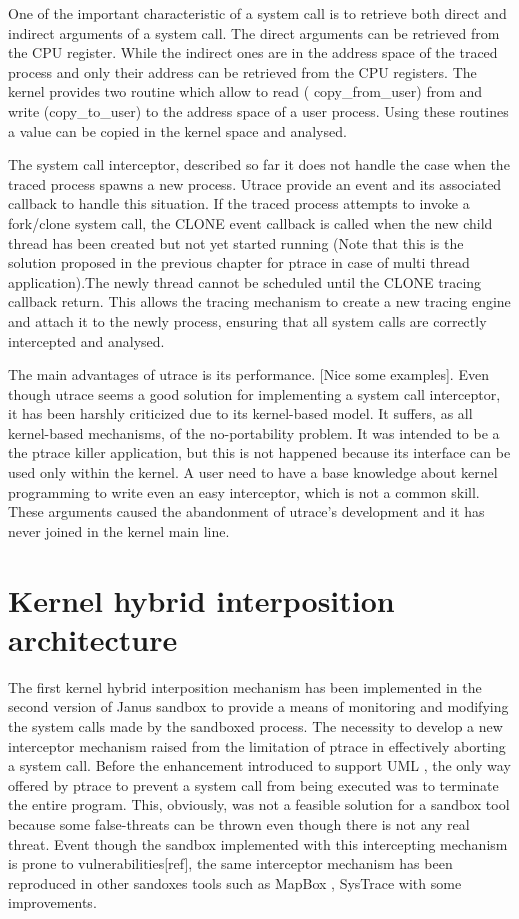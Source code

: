 One of the important characteristic of a system call is to retrieve both direct and indirect arguments of a system call. The direct arguments can be retrieved from the CPU register. While the indirect ones are in the address space of the traced process and only their address can be retrieved from the CPU registers. The kernel provides two routine which allow to read ( copy\_from\_user) from and write (copy\_to\_user) to the address space of a user process. Using these routines a value can be copied in the kernel space and analysed. 

The system call interceptor, described so far it does not handle the case when the traced process spawns a new process. Utrace provide an event and its associated callback to handle this situation. If the traced process attempts to invoke a fork/clone system call, the CLONE event callback is called when the new child thread has been created but not yet started running (Note that this is the solution proposed in the previous chapter for ptrace in case of multi thread application).The newly thread cannot be scheduled until the CLONE tracing callback return. 
This allows the tracing mechanism to create a new tracing engine and attach it to the newly process, ensuring that all system calls are correctly intercepted and analysed. 
 
The main advantages of utrace is its performance. [Nice some examples]. Even though utrace seems a good solution for implementing a system call interceptor, it has been harshly criticized due to its kernel-based model. It suffers, as all kernel-based mechanisms, of the no-portability problem. It was intended to be a the ptrace killer application, but this is not happened because its interface can be used only within the kernel. A user need to have a base knowledge about kernel programming to write even an easy interceptor, which is not a common skill. These arguments caused the abandonment of utrace's development and it has never joined in the kernel main line. 

\section{Kernel hybrid interposition architecture}
\label{interceptor_mechanism}

The first kernel hybrid interposition mechanism has been implemented in  the second version of Janus sandbox \cite{Janus} to provide a means of monitoring and modifying the system calls made by the sandboxed process. The necessity to develop a new interceptor mechanism raised from the limitation of ptrace in effectively aborting a system call. Before the enhancement introduced to support UML \cite{UML_1,UML_2}, the only way offered by ptrace to prevent a system call from being executed was to terminate the entire program. This, obviously, was not a feasible solution for a sandbox tool because some false-threats can be thrown even though there is not any real threat. 
Event though the sandbox implemented with this intercepting mechanism is prone to vulnerabilities[ref], the same interceptor mechanism has been reproduced in other sandoxes tools such as MapBox \cite{MapBox}, SysTrace \cite{systrace} with some improvements. 

